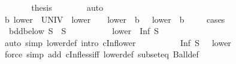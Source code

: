 \begin{isabellebody}
\ \ \ \ \isamarkupfalse%
\ \isamarkupfalse%
\ {\isacharquery}{\kern0pt}thesis\isanewline
\ \ \ \ \ \ \isamarkupfalse%
\ auto\isanewline
\ \ \isamarkupfalse%
\isanewline
\ \ \isamarkupfalse%
\isanewline
\ \ \isamarkupfalse%
\ {\isachardoublequoteopen}{\isasymexists}b{\isachardot}{\kern0pt}\ lower\ {\isacharequal}{\kern0pt}\ UNIV\ {\isasymor}\ lower\ {\isacharequal}{\kern0pt}\ {\isacharbraceleft}{\kern0pt}{\isacharbraceright}{\kern0pt}\ {\isasymor}\ lower\ {\isacharequal}{\kern0pt}\ {\isacharbraceleft}{\kern0pt}b\ {\isachardot}{\kern0pt}{\isachardot}{\kern0pt}{\isacharbraceright}{\kern0pt}\ {\isasymor}\ lower\ {\isacharequal}{\kern0pt}\ {\isacharbraceleft}{\kern0pt}b\ {\isacharless}{\kern0pt}{\isachardot}{\kern0pt}{\isachardot}{\kern0pt}{\isacharbraceright}{\kern0pt}{\isachardoublequoteclose}\isanewline
\ \ \isamarkupfalse%
\ cases\isanewline
\ \ \ \ \isamarkupfalse%
\ {\isacharasterisk}{\kern0pt}{\isacharcolon}{\kern0pt}\ {\isachardoublequoteopen}bdd{\isacharunderscore}{\kern0pt}below\ S\ {\isasymand}\ S\ {\isasymnoteq}\ {\isacharbraceleft}{\kern0pt}{\isacharbraceright}{\kern0pt}{\isachardoublequoteclose}\isanewline
\ \ \ \ \isamarkupfalse%
\ {\isacharasterisk}{\kern0pt}\ \isamarkupfalse%
\ {\isachardoublequoteopen}lower\ {\isasymsubseteq}\ {\isacharbraceleft}{\kern0pt}Inf\ S\ {\isachardot}{\kern0pt}{\isachardot}{\kern0pt}{\isacharbraceright}{\kern0pt}{\isachardoublequoteclose}\isanewline
\ \ \ \ \ \ \isamarkupfalse%
\ {\isacharparenleft}{\kern0pt}auto\ simp{\isacharcolon}{\kern0pt}\ lower{\isacharunderscore}{\kern0pt}def\ intro{\isacharcolon}{\kern0pt}\ cInf{\isacharunderscore}{\kern0pt}lower{}{\isacharparenright}{\kern0pt}\isanewline
\ \ \ \ \isamarkupfalse%
\ \isamarkupfalse%
\ {\isacharasterisk}{\kern0pt}\ \isamarkupfalse%
\ {\isachardoublequoteopen}{\isacharbraceleft}{\kern0pt}Inf\ S\ {\isacharless}{\kern0pt}{\isachardot}{\kern0pt}{\isachardot}{\kern0pt}{\isacharbraceright}{\kern0pt}\ {\isasymsubseteq}\ lower{\isachardoublequoteclose}\isanewline
\ \ \ \ \ \ \isamarkupfalse%
\ {\isacharparenleft}{\kern0pt}force\ simp\ add{\isacharcolon}{\kern0pt}\ cInf{\isacharunderscore}{\kern0pt}less{\isacharunderscore}{\kern0pt}iff\ lower{\isacharunderscore}{\kern0pt}def\ subset{\isacharunderscore}{\kern0pt}eq\ Ball{\isacharunderscore}{\kern0pt}def{\isacharparenright}{\kern0pt}\isanewline
\ \ \ \ \isamarkupfalse%

\end{isabellebody}

